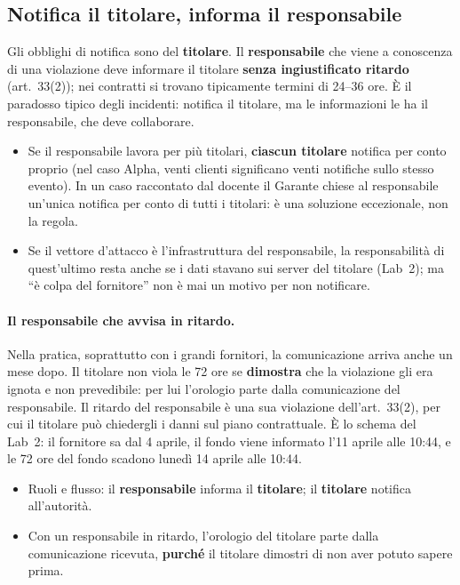 \subsection{Notifica il titolare, informa il responsabile}
Gli obblighi di notifica sono del \textbf{titolare}. Il \textbf{responsabile} che viene a conoscenza di
una violazione deve informare il titolare \textbf{senza ingiustificato ritardo} (art.~33(2)); nei
contratti si trovano tipicamente termini di 24--36 ore. È il paradosso tipico degli incidenti: notifica
il titolare, ma le informazioni le ha il responsabile, che deve collaborare.
\begin{itemize}
  \item Se il responsabile lavora per più titolari, \textbf{ciascun titolare} notifica per conto proprio
    (nel caso Alpha, venti clienti significano venti notifiche sullo stesso evento). In un caso raccontato
    dal docente il Garante chiese al responsabile un'unica notifica per conto di tutti i titolari: è una
    soluzione eccezionale, non la regola.
  \item Se il vettore d'attacco è l'infrastruttura del responsabile, la responsabilità di quest'ultimo
    resta anche se i dati stavano sui server del titolare (Lab~2); ma ``è colpa del fornitore'' non è mai
    un motivo per non notificare.
\end{itemize}

\paragraph{Il responsabile che avvisa in ritardo.} Nella pratica, soprattutto con i grandi fornitori, la
comunicazione arriva anche un mese dopo. Il titolare non viola le 72 ore se \textbf{dimostra} che la
violazione gli era ignota e non prevedibile: per lui l'orologio parte dalla comunicazione del
responsabile. Il ritardo del responsabile è una sua violazione dell'art.~33(2), per cui il titolare
può chiedergli i danni sul piano contrattuale. È lo schema del Lab~2: il fornitore sa dal 4 aprile, il
fondo viene informato l'11 aprile alle 10:44, e le 72 ore del fondo scadono lunedì 14 aprile alle 10:44.

\begin{esame}
\begin{itemize}
  \item Ruoli e flusso: il \textbf{responsabile} informa il \textbf{titolare}; il \textbf{titolare}
    notifica all'autorità.
  \item Con un responsabile in ritardo, l'orologio del titolare parte dalla comunicazione ricevuta,
    \textbf{purché} il titolare dimostri di non aver potuto sapere prima.
\end{itemize}
\end{esame}

